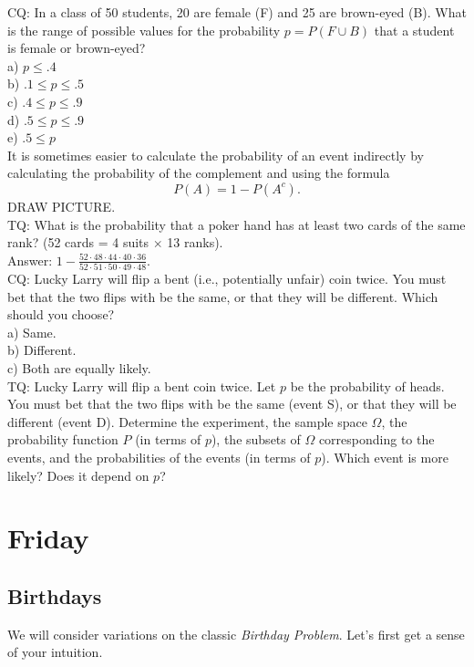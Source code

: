 \documentclass[12pt]{article}
\begin{document}
CQ: In a class of 50 students, 20 are female (F) and 25 are brown-eyed (B).  What is the range of possible values for the probability $p = P(F \cup B)$ that a student is female or brown-eyed? \\
a) $p \leq .4$ \\
b) $.1 \leq p \leq .5$ \\
c) $.4 \leq p \leq .9$ \\
d) $.5 \leq p \leq .9$ \\
e) $.5 \leq p$ \\

It is sometimes easier to calculate the probability of an event indirectly by calculating the probability of the complement and using the formula
$$P(A) = 1 - P(A^c).$$
DRAW PICTURE. \\

TQ: What is the probability that a poker hand has at least two cards of the same rank?  (52 cards = 4 suits $\times$ 13 ranks).\\

Answer: $1 - \frac{52\cdot48\cdot44\cdot40\cdot36}{52\cdot51\cdot50\cdot49\cdot48}.$\\

CQ: Lucky Larry will flip a bent (i.e., potentially unfair) coin twice.  You must bet that the two flips with be the same, or that they will be different.  Which should you choose? \\
a) Same.  \\
b) Different. \\
c) Both are equally likely. \\

TQ:  Lucky Larry will flip a bent coin twice.  Let $p$ be the probability of heads.  You must bet that the two flips with be the same (event S), or that they will be different (event D).  Determine the experiment, the sample space $\Omega$, the probability function $P$ (in terms of $p$), the subsets of $\Omega$ corresponding to the events, and the probabilities of the events (in terms of $p$).  Which event is more likely?  Does it depend on $p$?

\newpage

\section{Friday}

\subsection{Birthdays}
We will consider variations on the classic {\em Birthday Problem}. Let's first get a sense of your intuition. \\
\end{document}
